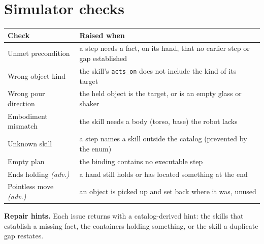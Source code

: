 \documentclass[10pt,twocolumn,letterpaper]{article}
\newcommand{\code}[1]{\texttt{\small #1}}
\begin{document}
\section{Simulator checks}\label{app:checks}
\noindent\begin{minipage}{\columnwidth}
\centering\footnotesize
\setlength{\tabcolsep}{3pt}
\begin{tabular}{@{}>{\raggedright\arraybackslash}p{}>{\raggedright\arraybackslash}p{}@{}}
\toprule
Check & Raised when \\
\midrule
Unmet precondition & a step needs a fact, on its hand, that no earlier step or gap established \\
Wrong object kind & the skill's \code{acts\_on} does not include the kind of its target \\
Wrong pour direction & the held object is the target, or is an empty glass or shaker \\
Embodiment mismatch & the skill needs a body (torso, base) the robot lacks \\
Unknown skill & a step names a skill outside the catalog (prevented by the enum) \\
Empty plan & the binding contains no executable step \\
\midrule
Ends holding \emph{(adv.)} & a hand still holds or has located something at the end \\
Pointless move \emph{(adv.)} & an object is picked up and set back where it was, unused \\
\bottomrule
\end{tabular}
\label{tab:checks}
\end{minipage}

\vspace{4pt}
\noindent\textbf{Repair hints.} Each issue returns with a catalog-derived hint: the
skills that establish a missing fact, the containers holding something, or the
skill a duplicate gap restates.
\end{document}
